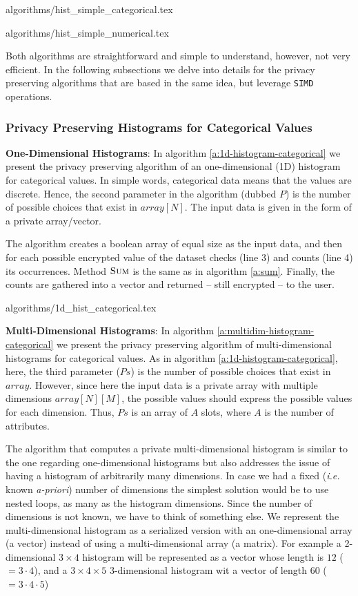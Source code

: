 {algorithms/hist_simple_categorical.tex}

{algorithms/hist_simple_numerical.tex}

Both algorithms are straightforward and simple to understand, however, not very efficient.
In the following subsections we delve into details for the privacy preserving algorithms that are based in the same idea, but leverage \texttt{SIMD} operations.


\subsubsection{Privacy Preserving Histograms for Categorical Values}\label{sss:histogram-categorical}
\textbf{One-Dimensional Histograms}: In algorithm \ref{a:1d-histogram-categorical} we present the privacy preserving algorithm of an one-dimensional (1D) histogram for categorical values.
In simple words, categorical data means that the values are discrete.
Hence, the second parameter in the algorithm (dubbed $P$) is the number of possible choices that exist in $array[N]$.
The input data is given in the form of a private array/vector.

The algorithm creates a boolean array of equal size as the input data, and then for each possible encrypted value of the dataset checks (line 3) and counts (line 4) its occurrences.
Method { $\textsc{Sum}$} is the same as in algorithm \ref{a:sum}.
Finally, the counts are gathered into a vector and returned -- still encrypted -- to the user.

{algorithms/1d_hist_categorical.tex}



\textbf{Multi-Dimensional Histograms}: In algorithm \ref{a:multidim-histogram-categorical} we present the privacy preserving algorithm of multi-dimensional histograms for categorical values.
As in algorithm \ref{a:1d-histogram-categorical}, here, the third parameter ($Ps$) is the number of possible choices that exist in $array$.
However, since here the input data is a private array with multiple dimensions $array[N][M]$, the possible values should express the possible values for each dimension.
Thus, $Ps$ is an array of $A$ slots, where $A$ is the number of attributes.


The algorithm that computes a private multi-dimensional histogram is similar to the one regarding one-dimensional histograms but also addresses the issue of having a histogram of arbitrarily many dimensions.
In case we had a fixed (\textit{i.e.} known \textit{a-priori}) number of dimensions the simplest solution would be to use nested loops, as many as the histogram dimensions.
Since the number of dimensions is not known, we have to think of something else.
We represent the multi-dimensional histogram as a serialized version with an one-dimensional array (a vector) instead of using a multi-dimensional array (a matrix).
For example a 2-dimensional $3 \times 4$ histogram will be represented as a vector whose length is $ 12 $ ($= 3 \cdot 4$), and a $3 \times 4 \times 5$ 3-dimensional histogram wit a vector of length $ 60 $ ($= 3 \cdot 4 \cdot 5$)

